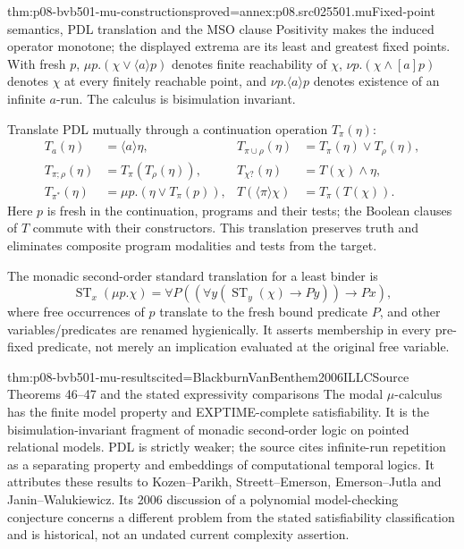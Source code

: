 \begin{hbtheorem}{thm:p08-bvb501-mu-constructions}{proved=annex:p08.src025501.mu}{Fixed-point semantics, PDL translation and the MSO clause}
Positivity makes the induced operator monotone; the displayed extrema
are its least and greatest fixed points. With fresh \(p\),
\(\mu p.(\chi\lor\langle a\rangle p)\) denotes finite
reachability of \(\chi\), \(\nu p.(\chi\land[a]p)\)
denotes \(\chi\) at every finitely reachable point, and
\(\nu p.\langle a\rangle p\) denotes existence of an infinite
\(a\)-run. The calculus is bisimulation invariant.

Translate PDL mutually through a continuation operation \(T_\pi(\eta)\):
\[
 \begin{aligned}
 T_a(\eta)&=\langle a\rangle\eta,&
 T_{\pi\cup\rho}(\eta)&=T_\pi(\eta)\lor T_\rho(\eta),\\
 T_{\pi;\rho}(\eta)&=T_\pi(T_\rho(\eta)),&
 T_{\chi?}(\eta)&=T(\chi)\land\eta,\\
 T_{\pi^*}(\eta)&=\mu p.(\eta\lor T_\pi(p)),&
 T(\langle\pi\rangle\chi)&=T_\pi(T(\chi)).
 \end{aligned}
\]
Here \(p\) is fresh in the continuation, programs and their tests;
the Boolean clauses of \(T\) commute with their constructors.
This translation preserves truth and eliminates composite program
modalities and tests from the target.

The monadic second-order standard translation for a least binder is
\[
 \operatorname{ST}_x(\mu p.\chi)=
 \forall P\left((\forall y(\operatorname{ST}_y(\chi)\to Py))\to Px\right),
\]
where free occurrences of \(p\) translate to the fresh bound predicate
\(P\), and other variables/predicates are renamed hygienically.
It asserts membership in every pre-fixed predicate, not merely an
implication evaluated at the original free variable.
\end{hbtheorem}

\begin{hbtheorem}{thm:p08-bvb501-mu-results}{cited=BlackburnVanBenthem2006ILLC}{Source Theorems 46--47 and the stated expressivity comparisons}
The modal \(\mu\)-calculus has the finite model property and
EXPTIME-complete satisfiability. It is the bisimulation-invariant
fragment of monadic second-order logic on pointed relational models.
PDL is strictly weaker; the source cites infinite-run repetition as
a separating property and embeddings of computational temporal logics.
It attributes these results to Kozen--Parikh, Streett--Emerson,
Emerson--Jutla and Janin--Walukiewicz. Its 2006 discussion of a
polynomial model-checking conjecture concerns a different problem from
the stated satisfiability classification and is historical, not an
undated current complexity assertion.
\end{hbtheorem}

